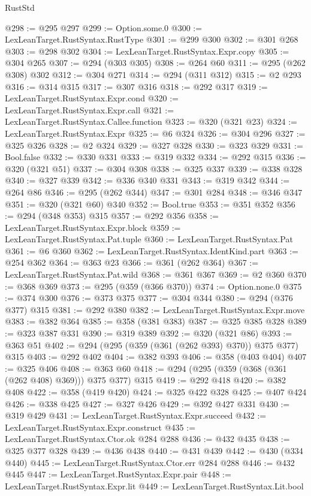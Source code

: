 \begin{lexlean}{RustStd}
\begin{coremodule}
@298 := @295 @297
@299 := Option.some.{0}
@300 := LexLeanTarget.RustSyntax.RustType
@301 := @299 @300
@302 := @301 @268
@303 := @298 @302
@304 := LexLeanTarget.RustSyntax.Expr.copy
@305 := @304 @265
@307 := @294 (@303 @305)
@308 := @264 @60
@311 := @295 (@262 @308) @302
@312 := @304 @271
@314 := @294 (@311 @312)
@315 := @2 @293
@316 := @314 @315
@317 := @307 @316
@318 := @292 @317
@319 := LexLeanTarget.RustSyntax.Expr.cond
@320 := LexLeanTarget.RustSyntax.Expr.call
@321 := LexLeanTarget.RustSyntax.Callee.function
@323 := @320 (@321 @23)
@324 := LexLeanTarget.RustSyntax.Expr
@325 := @6 @324
@326 := @304 @296
@327 := @325 @326
@328 := @2 @324
@329 := @327 @328
@330 := @323 @329
@331 := Bool.false
@332 := @330 @331
@333 := @319 @332
@334 := @292 @315
@336 := @320 (@321 @51)
@337 := @304 @308
@338 := @325 @337
@339 := @338 @328
@340 := @327 @339
@342 := @336 @340 @331
@343 := @319 @342
@344 := @264 @86
@346 := @295 (@262 @344)
@347 := @301 @284
@348 := @346 @347
@351 := @320 (@321 @60) @340
@352 := Bool.true
@353 := @351 @352
@356 := @294 (@348 @353) @315
@357 := @292 @356
@358 := LexLeanTarget.RustSyntax.Expr.block
@359 := LexLeanTarget.RustSyntax.Pat.tuple
@360 := LexLeanTarget.RustSyntax.Pat
@361 := @6 @360
@362 := LexLeanTarget.RustSyntax.IdentKind.part
@363 := @254 @362
@364 := @363 @23
@366 := @361 (@262 @364)
@367 := LexLeanTarget.RustSyntax.Pat.wild
@368 := @361 @367
@369 := @2 @360
@370 := @368 @369
@373 := @295 (@359 (@366 @370))
@374 := Option.none.{0}
@375 := @374 @300
@376 := @373 @375
@377 := @304 @344
@380 := @294 (@376 @377) @315
@381 := @292 @380
@382 := LexLeanTarget.RustSyntax.Expr.move
@383 := @382 @364
@385 := @358 (@381 @383)
@387 := @325 @385 @328
@389 := @323 @387 @331
@390 := @319 @389
@392 := @320 (@321 @86)
@393 := @363 @51
@402 := @294 (@295 (@359 (@361 (@262 @393) @370)) @375 @377) @315
@403 := @292 @402
@404 := @382 @393
@406 := @358 (@403 @404)
@407 := @325 @406
@408 := @363 @60
@418 := @294 (@295 (@359 (@368 (@361 (@262 @408) @369))) @375 @377) @315
@419 := @292 @418
@420 := @382 @408
@422 := @358 (@419 @420)
@424 := @325 @422 @328
@425 := @407 @424
@426 := @338 @425
@427 := @327 @426
@429 := @392 @427 @331
@430 := @319 @429
@431 := LexLeanTarget.RustSyntax.Expr.succeed
@432 := LexLeanTarget.RustSyntax.Expr.construct
@435 := LexLeanTarget.RustSyntax.Ctor.ok @284 @288
@436 := @432 @435
@438 := @325 @377 @328
@439 := @436 @438
@440 := @431 @439
@442 := @430 (@334 @440)
@445 := LexLeanTarget.RustSyntax.Ctor.err @284 @288
@446 := @432 @445
@447 := LexLeanTarget.RustSyntax.Expr.pair
@448 := LexLeanTarget.RustSyntax.Expr.lit
@449 := LexLeanTarget.RustSyntax.Lit.bool

\end{coremodule}
\end{lexlean}
